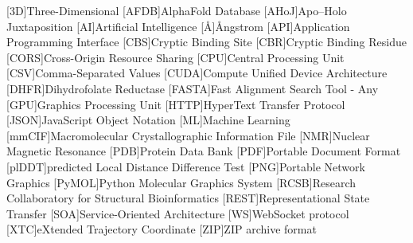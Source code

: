 

\begin{acronym}[RCSB]

[3D]{Three-Dimensional}
[AFDB]{AlphaFold Database}
[AHoJ]{Apo–Holo Juxtaposition}
[AI]{Artificial Intelligence}
[\AA]{\AA{}ngstrom}
[API]{Application Programming Interface}
[CBS]{Cryptic Binding Site}
[CBR]{Cryptic Binding Residue}
[CORS]{Cross-Origin Resource Sharing}
[CPU]{Central Processing Unit}
[CSV]{Comma-Separated Values}
[CUDA]{Compute Unified Device Architecture}
[DHFR]{Dihydrofolate Reductase}
[FASTA]{Fast Alignment Search Tool - Any}
[GPU]{Graphics Processing Unit}
[HTTP]{HyperText Transfer Protocol}
[JSON]{JavaScript Object Notation}
[ML]{Machine Learning}
[mmCIF]{Macromolecular Crystallographic Information File}
[NMR]{Nuclear Magnetic Resonance}
[PDB]{Protein Data Bank}
[PDF]{Portable Document Format}
[plDDT]{predicted Local Distance Difference Test}
[PNG]{Portable Network Graphics}
[PyMOL]{Python Molecular Graphics System}
[RCSB]{Research Collaboratory for Structural Bioinformatics}
[REST]{Representational State Transfer}
[SOA]{Service-Oriented Architecture}
[WS]{WebSocket protocol}
[XTC]{eXtended Trajectory Coordinate}
[ZIP]{ZIP archive format}

\end{acronym}